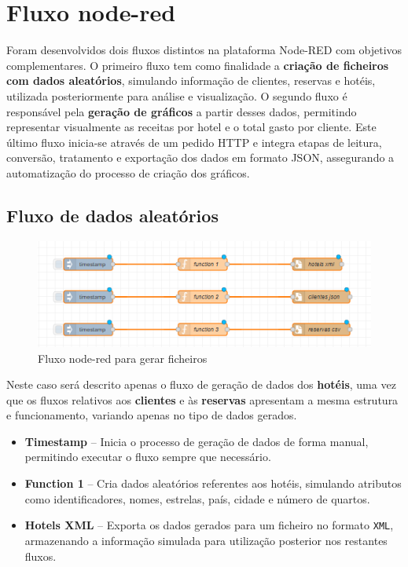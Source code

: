 \documentclass[a4paper, 12pt]{article} %
\begin{document}
\section{Fluxo node-red}
Foram desenvolvidos dois fluxos distintos na plataforma Node-RED com objetivos complementares.  
O primeiro fluxo tem como finalidade a \textbf{criação de ficheiros com dados aleatórios}, simulando informação de clientes, reservas e hotéis, utilizada posteriormente para análise e visualização.  
O segundo fluxo é responsável pela \textbf{geração de gráficos} a partir desses dados, permitindo representar visualmente as receitas por hotel e o total gasto por cliente.  
Este último fluxo inicia-se através de um pedido HTTP e integra etapas de leitura, conversão, tratamento e exportação dos dados em formato JSON, assegurando a automatização do processo de criação dos gráficos.
\subsection{Fluxo de dados aleatórios}
\begin{figure}[H] 
	\centering 
	\includegraphics[width=1\textwidth]{images/node-red_ficheiros.png}
	\caption{Fluxo node-red para gerar ficheiros}
	\label{fig:node-red_gerar_ficheiros}
\end{figure}
Neste caso será descrito apenas o fluxo de geração de dados dos \textbf{hotéis}, uma vez que os fluxos relativos aos \textbf{clientes} e às \textbf{reservas} apresentam a mesma estrutura e funcionamento, variando apenas no tipo de dados gerados.  

\begin{itemize}
	\item \textbf{Timestamp} – Inicia o processo de geração de dados de forma manual, permitindo executar o fluxo sempre que necessário.
	\item \textbf{Function 1} – Cria dados aleatórios referentes aos hotéis, simulando atributos como identificadores, nomes, estrelas, país, cidade e número de quartos.
	\item \textbf{Hotels XML} – Exporta os dados gerados para um ficheiro no formato \texttt{XML}, armazenando a informação simulada para utilização posterior nos restantes fluxos.
\end{itemize}
\newpage
\end{document}
